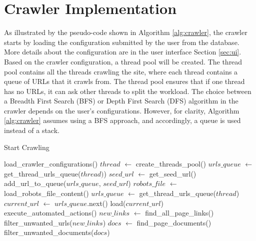 \pagebreak
\section{Crawler Implementation}\label{sec:crawler-implementation}

As illustrated by the pseudo-code shown in Algorithm \ref{alg:crawler}, the crawler starts by loading the configuration submitted by the user from the database. More details about the configuration are in the user interface Section \ref{sec:ui}. Based on the crawler configuration, a thread pool will be created. The thread pool contains all the threads crawling the site, where each thread contains a queue of URLs that it crawls from. The thread pool ensures that if one thread has no URLs, it can ask other threads to split the workload. The choice between a Breadth First Search (BFS) or Depth First Search (DFS) algorithm in the crawler depends on the user's configurations. However, for clarity, Algorithm \ref{alg:crawler} assumes using a BFS approach, and accordingly, a queue is used instead of a stack.


\begin{algorithm}[H]
	\caption{Start Crawling}\label{alg:crawler}
	\begin{algorithmic}[1]
		\State load\_crawler\_configurations() 
		\State $thread$ $\gets$ create\_threads\_pool() 
	    \State $urls\_queue$ $\gets$ get\_thread\_urls\_queue($thread)$)
	    \State $seed\_url$ $\gets$ get\_seed\_url()
	    \State add\_url\_to\_queue($urls\_queue$, $seed\_url$)
	    \State $robots\_file$ $\gets$ load\_robots\_file\_content()
		    \State $urls\_queue$ $\gets$ get\_thread\_urls\_queue($thread$)
		\Else
			\State $current\_url$ $\gets$ $urls\_queue$.next()
			\State load($current\_url$) 
            \State execute\_automated\_actions() 
			\State $new\_links$ $\gets$  find\_all\_page\_links() 
   			\State filter\_unwanted\_urls($new\_links$) 
			\State $docs$ $\gets$ find\_page\_documents() 
			\State filter\_unwanted\_documents($docs$)
		\EndIf
		\EndWhile
	\end{algorithmic}
\end{algorithm}


